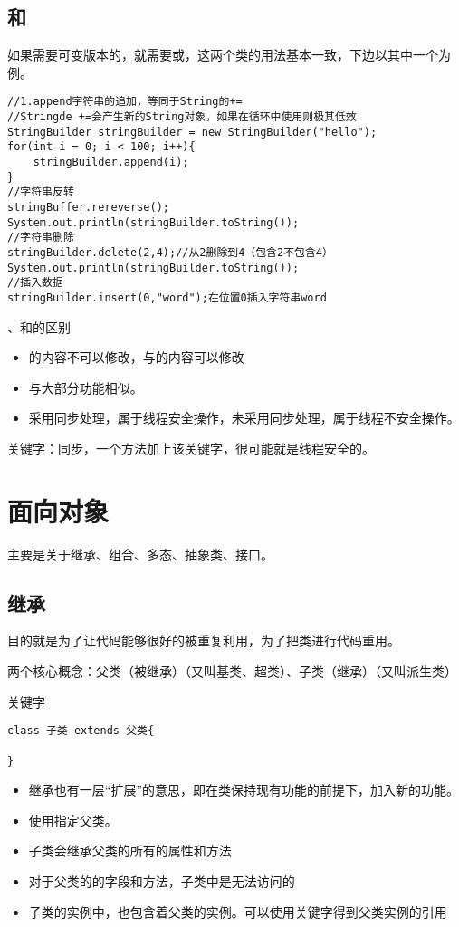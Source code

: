 \documentclass[a4paper]{report}
\begin{document}
\subsection{和}
如果需要可变版本的，就需要或，这两个类的用法基本一致，下边以其中一个为例。
\begin{lstlisting}[title=\dm{StringBuilder}用法]
//1.append字符串的追加，等同于String的+=
//Stringde +=会产生新的String对象，如果在循环中使用则极其低效
StringBuilder stringBuilder = new StringBuilder("hello");
for(int i = 0; i < 100; i++){
    stringBuilder.append(i);
}
//字符串反转
stringBuffer.rereverse();
System.out.println(stringBuilder.toString());
//字符串删除
stringBuilder.delete(2,4);//从2删除到4（包含2不包含4）
System.out.println(stringBuilder.toString());
//插入数据
stringBuilder.insert(0,"word");在位置0插入字符串word
\end{lstlisting}

、和的区别
\begin{itemize}
\itemsep=0pt \parskip =0pt
  \item {}的内容不可以修改，与的内容可以修改
  \item {}与大部分功能相似。
  \item {}采用同步处理，属于线程安全操作，未采用同步处理，属于线程不安全操作。
\end{itemize}

关键字：同步，一个方法加上该关键字，很可能就是线程安全的。
\section{面向对象}
主要是关于继承、组合、多态、抽象类、接口。
\subsection{继承}
目的就是为了让代码能够很好的被重复利用，为了把类进行代码重用。

两个核心概念：父类（被继承）（又叫基类、超类）、子类（继承）（又叫派生类）

关键字
\begin{lstlisting}[title=继承语法]
class 子类 extends 父类{

}
\end{lstlisting}
\begin{itemize}
\itemsep=0pt \parskip =0pt
  \item 继承也有一层“扩展”的意思，即在类保持现有功能的前提下，加入新的功能。
  \item 使用指定父类。
  \item 子类会继承父类的所有的属性和方法
  \item 对于父类的的字段和方法，子类中是无法访问的
  \item 子类的实例中，也包含着父类的实例。可以使用关键字得到父类实例的引用
\end{itemize}
\end{document}
